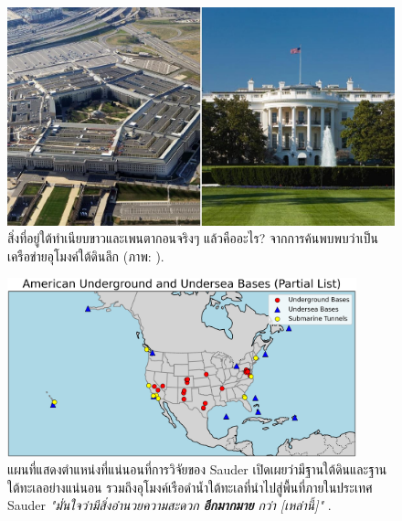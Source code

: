 \documentclass[10pt,twocolumn,letterpaper]{article}
\begin{document}
\begin{figure}[b]
\begin{center}
   \includegraphics[width=1\linewidth]{penta.jpg}
\end{center}
   \caption{สิ่งที่อยู่ใต้ทำเนียบขาวและเพนตากอนจริงๆ แล้วคืออะไร? จากการค้นพบพบว่าเป็นเครือข่ายอุโมงค์ใต้ดินลึก (ภาพ: \cite{31}).}
\label{fig:3}
\label{fig:onecol}
\end{figure}
\begin{figure}[t]
\begin{center}
\includegraphics[width=0.9\textwidth]{basescrop.png}
\end{center}
\caption{แผนที่แสดงตำแหน่งที่แน่นอนที่การวิจัยของ Sauder เปิดเผยว่ามีฐานใต้ดินและฐานใต้ทะเลอย่างแน่นอน รวมถึงอุโมงค์เรือดำน้ำใต้ทะเลที่นำไปสู่พื้นที่ภายในประเทศ Sauder \textit{"มั่นใจว่ามีสิ่งอำนวยความสะดวก \textbf{อีกมากมาย} กว่า [เหล่านี้]"} \cite{22}.}
\label{fig:4}
\end{figure}
\end{document}
